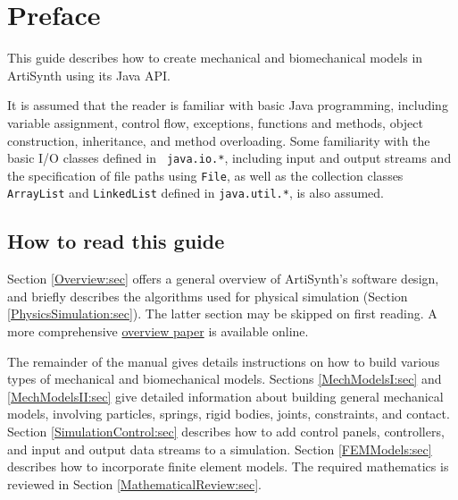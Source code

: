 
\def\maindoc{}%
\def\doctitle{ArtiSynth Modeling Guide}




\chapter*{Preface}

This guide describes how to create mechanical and biomechanical models
in ArtiSynth using its Java API. 

It is assumed that the reader is familiar with basic Java programming,
including variable assignment, control flow, exceptions, functions and
methods, object construction, inheritance, and method overloading.
Some familiarity with the basic I/O classes defined in {\tt
java.io.*}, including input and output streams and the specification
of file paths using {\tt File}, as well as the collection classes
{\tt ArrayList} and {\tt LinkedList} defined in {\tt java.util.*}, is
also assumed.

\section*{How to read this guide}

Section \ref{Overview:sec} offers a general overview of ArtiSynth's
software design, and briefly describes the algorithms used for
physical simulation (Section \ref{PhysicsSimulation:sec}). The latter
section may be skipped on first reading. A more comprehensive
\href{http://www.artisynth.org/doc/artisynth.pdf}{overview paper} is
available online.

The remainder of the manual gives details instructions on how to build
various types of mechanical and biomechanical models.  Sections
\ref{MechModelsI:sec} and \ref{MechModelsII:sec} give detailed
information about building general mechanical models, involving
particles, springs, rigid bodies, joints, constraints, and
contact. Section \ref{SimulationControl:sec} describes how to add
control panels, controllers, and input and output data streams to a
simulation.  Section \ref{FEMModels:sec} describes how to incorporate
finite element models. The required mathematics is reviewed in Section
\ref{MathematicalReview:sec}.

